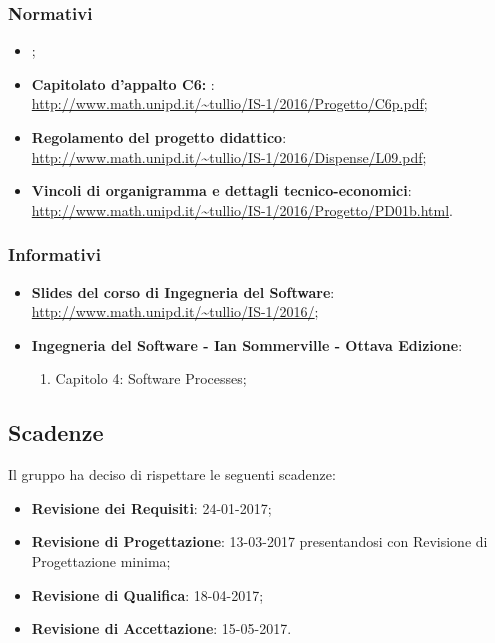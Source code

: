 		\subsubsection{Normativi}
		\begin{itemize}
			\item \emph{\NdP};
			\item \textbf{Capitolato d'appalto C6: \proj}:
			\\ \url{http://www.math.unipd.it/~tullio/IS-1/2016/Progetto/C6p.pdf};
			\item \textbf{Regolamento del progetto didattico}:
			\\ \url{http://www.math.unipd.it/~tullio/IS-1/2016/Dispense/L09.pdf};
			\item \textbf{Vincoli di organigramma e dettagli tecnico-economici}:
			\\ \url{http://www.math.unipd.it/~tullio/IS-1/2016/Progetto/PD01b.html}.
			\
		\end{itemize}
		\subsubsection{Informativi}
		\begin{itemize}
			\item \textbf{Slides del corso di Ingegneria del Software}:
			\\ \url{http://www.math.unipd.it/~tullio/IS-1/2016/};
			\item \textbf{Ingegneria del Software - Ian Sommerville - Ottava Edizione}:
			\begin{enumerate}
				\item Capitolo 4: Software Processes;
			\end{enumerate}
		\end{itemize}

	\subsection{Scadenze}
	Il gruppo \hx{} ha deciso di rispettare le seguenti scadenze:
		\begin{itemize}
			\item \textbf{Revisione dei Requisiti}: 24-01-2017;
			\item \textbf{Revisione di Progettazione}: 13-03-2017 presentandosi con Revisione di Progettazione minima;
			\item \textbf{Revisione di Qualifica}: 18-04-2017;
			\item \textbf{Revisione di Accettazione}: 15-05-2017.
		\end{itemize}


